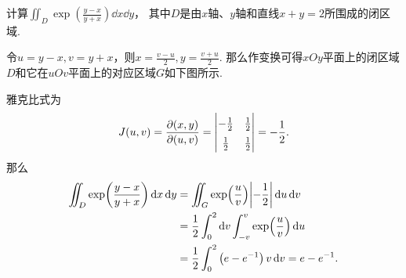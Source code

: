 \begin{example}
计算\(\iint_D \exp(\frac{y-x}{y+x}) \dd{x} \dd{y}\)，
其中\(D\)是由\(x\)轴、\(y\)轴和直线\(x+y=2\)所围成的闭区域.
\begin{solution}
令\(u = y-x, v = y+x\)，则\(x = \frac{v-u}{2}, y = \frac{v+u}{2}\).
那么作变换可得\(xOy\)平面上的闭区域\(D\)和它在\(uOv\)平面上的对应区域\(G\)如下图所示.

\begin{figure}[htb]
	\def\subwidth{.5\linewidth}
	\begin{subfigure}[b]{\subwidth}
		\centering
		\subcaption{}
	\end{subfigure}%
	\begin{subfigure}[b]{\subwidth}
		\centering
		\subcaption{}
	\end{subfigure}%
	\caption{}
\end{figure}

雅克比式为\begin{equation*}
	J(u,v)
	= \jacobi{x,y}{u,v}
	= \def\arraystretch{1.5} \begin{vmatrix}
	-\frac12 & \frac12 \\
	\frac12 & \frac12
	\end{vmatrix}
	= - \frac12.
\end{equation*}
那么\begin{align*}
	\iint_D \exp(\frac{y-x}{y+x}) \dd{x} \dd{y}
	&= \iint_G \exp(\frac{u}{v}) \abs{-\frac12} \dd{u} \dd{v} \\
	&= \frac12 \int_0^2 \dd{v} \int_{-v}^v \exp(\frac{u}{v}) \dd{u} \\
	&= \frac12 \int_0^2 \left( e - e^{-1} \right) v \dd{v}
	= e - e^{-1}.
\end{align*}
\end{solution}
\end{example}

